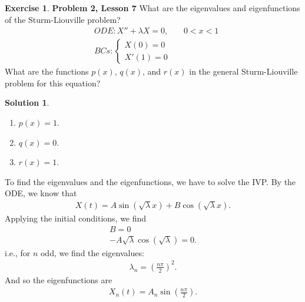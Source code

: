 \documentclass{article}
\theoremstyle{definition}
\newtheorem*{exer*}{Exercise}
\newtheorem*{sln*}{Solution}
\begin{document}
\begin{exer*}\textbf{Problem 2, Lesson 7}
	What are the eigenvalues and eigenfunctions of the Sturm-Liouville problem?
	\begin{align*}
	&ODE: X'' + \lambda X = 0,\,\,\,\,\,\,\,\,\,\,\, 0<x<1\\
	&BCs:  
	\begin{cases}
	X(0) = 0\\
	X'(1) = 0
	\end{cases}
	\end{align*}
	What are the functions $p(x)$, $q(x)$, and $r(x)$ in the general Sturm-Liouville problem for this equation? 
	
	\begin{sln*} 
		$\,$
		\begin{enumerate}
			\item $p(x) = 1$.
			\item $q(x) = 0$.
			\item $r(x) = 1$.
		\end{enumerate}
		To find the eigenvalues and the eigenfunctions, we have to solve the IVP. By the ODE, we know that 
		\begin{align*}
		X(t) = A\sin(\sqrt{\lambda}x) + B\cos(\sqrt{\lambda} x).
		\end{align*}
		Applying the initial conditions, we find 
		\begin{align*}
		B = 0\\
		-A\sqrt{\lambda}\cos(\sqrt{\lambda}) = 0.
		\end{align*}
		i.e., for $n$ odd, we find the eigenvalues:
		\begin{align*}
		\lambda_n = \left( \frac{n\pi}{2} \right)^2.
		\end{align*}
		And so the eigenfunctions are
		\begin{align*}
		X_n(t) = A_n\sin\left( \frac{n\pi}{2} \right).
		\end{align*}
	\end{sln*}
\end{exer*}
\newpage
\end{document}
